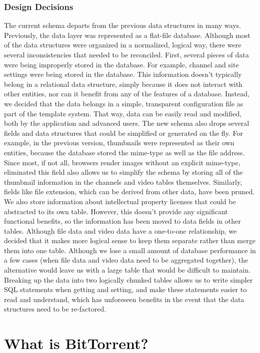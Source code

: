 \documentclass[a4paper,12pt]{report}
\begin{document}
\subsection{Design Decisions}
	The current schema departs from the previous data structures in many ways. Previously, the data layer was represented as a flat-file database. Although most of the data structures were organized in a normalized, logical way, there were several inconsistencies that needed to be reconciled.
	First, several pieces of data were being improperly stored in the database. For example, channel and site settings were being stored in the database. This information doesn't typically belong in a relational data structure, simply because it does not interact with other entities, nor can it benefit from any of the features of a database. Instead, we decided that the data belongs in a simple, transparent configuration file as part of the template system. That way, data can be easily read and modified, both by the application and advanced users. 
	The new schema also drops several fields and data structures that could be simplified or generated on the fly. For example, in the previous version, thumbnails were represented as their own entities, because the database stored the mime-type as well as the file address. Since most, if not all, browsers render images without an explicit mime-type, eliminated this field also allows us to simplify the schema by storing all of the thumbnail information in the channels and video tables themselves. Similarly, fields like file extension, which can be derived from other data, have been pruned. We also store information about intellectual property licenses that could be abstracted to its own table. However, this doesn't provide any significant functional benefits, so the information has been moved to data fields in other tables.
	Although file data and video data have a one-to-one relationship, we decided that it makes more logical sense to keep them separate rather than merge them into one table. Although we lose a small amount of database performance in a few cases (when file data and video data need to be aggregated together), the alternative would leave us with a large table that would be difficult to maintain. Breaking up the data into two logically chunked tables allows us to write simpler SQL statements when getting and setting, and make these statements easier to read and understand, which has unforeseen benefits in the event that the data structures need to be re-factored.

\chapter{What is BitTorrent?}
\end{document}
